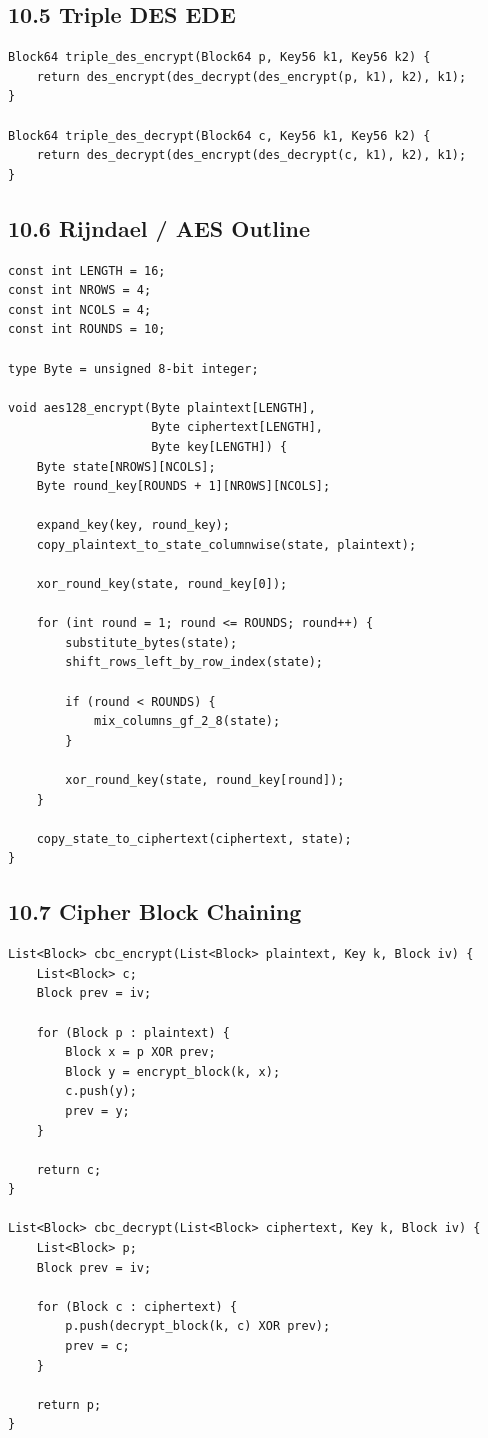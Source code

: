 \documentclass[11pt]{article}
\begin{document}
\subsection{10.5 Triple DES EDE}\label{triple-des-ede}

\begin{verbatim}
Block64 triple_des_encrypt(Block64 p, Key56 k1, Key56 k2) {
    return des_encrypt(des_decrypt(des_encrypt(p, k1), k2), k1);
}

Block64 triple_des_decrypt(Block64 c, Key56 k1, Key56 k2) {
    return des_decrypt(des_encrypt(des_decrypt(c, k1), k2), k1);
}
\end{verbatim}

\subsection{10.6 Rijndael / AES Outline}\label{rijndael-aes-outline}

\begin{verbatim}
const int LENGTH = 16;
const int NROWS = 4;
const int NCOLS = 4;
const int ROUNDS = 10;

type Byte = unsigned 8-bit integer;

void aes128_encrypt(Byte plaintext[LENGTH],
                    Byte ciphertext[LENGTH],
                    Byte key[LENGTH]) {
    Byte state[NROWS][NCOLS];
    Byte round_key[ROUNDS + 1][NROWS][NCOLS];

    expand_key(key, round_key);
    copy_plaintext_to_state_columnwise(state, plaintext);

    xor_round_key(state, round_key[0]);

    for (int round = 1; round <= ROUNDS; round++) {
        substitute_bytes(state);
        shift_rows_left_by_row_index(state);

        if (round < ROUNDS) {
            mix_columns_gf_2_8(state);
        }

        xor_round_key(state, round_key[round]);
    }

    copy_state_to_ciphertext(ciphertext, state);
}
\end{verbatim}

\subsection{10.7 Cipher Block Chaining}\label{cipher-block-chaining}

\begin{verbatim}
List<Block> cbc_encrypt(List<Block> plaintext, Key k, Block iv) {
    List<Block> c;
    Block prev = iv;

    for (Block p : plaintext) {
        Block x = p XOR prev;
        Block y = encrypt_block(k, x);
        c.push(y);
        prev = y;
    }

    return c;
}

List<Block> cbc_decrypt(List<Block> ciphertext, Key k, Block iv) {
    List<Block> p;
    Block prev = iv;

    for (Block c : ciphertext) {
        p.push(decrypt_block(k, c) XOR prev);
        prev = c;
    }

    return p;
}
\end{verbatim}
\end{document}
